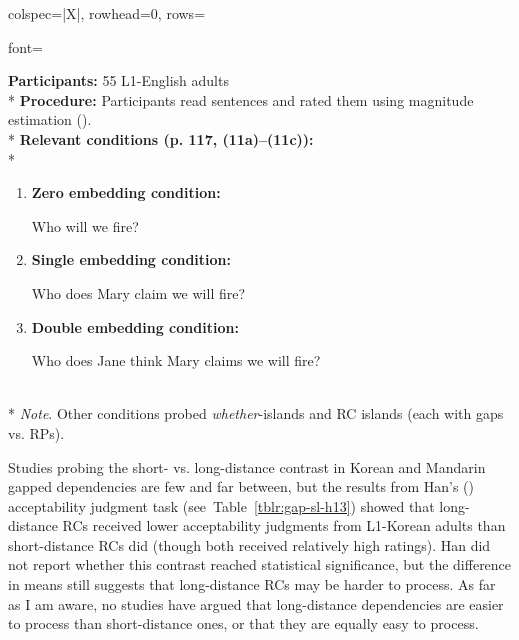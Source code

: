 \begin{longtblr}[caption={\textcite{alexopoulou.keller2007}: Acceptability judgment task (Experiment 1)}, label={tblr:gap-sl-ak07}]{colspec={|X|}, rowhead=0, rows={font=\raggedright{}}}\hline
\textbf{Participants:} 55 L1-English adults \vspace{5pt}\\*
\textbf{Procedure:} Participants read sentences and rated them using magnitude estimation (\cite{bard.etal1996}). \vspace{5pt}\\*
\textbf{Relevant conditions (p. 117, (11a)--(11c)):} \vspace{5pt}\\*
\begin{varwidth}{\linewidth}\begin{enumerate}[\bfseries (a),itemsep=5pt] 
\item \textbf{Zero embedding condition:}\par\nobreak
Who will we fire?
\item \textbf{Single embedding condition:}\par\nobreak
Who does Mary claim we will fire?
\item \textbf{Double embedding condition:}\par\nobreak
Who does Jane think Mary claims we will fire?
\end{enumerate}\end{varwidth}\vspace{5pt}\\*
\textit{Note}. Other conditions probed \textit{whether}-islands and RC islands (each with gaps vs. RPs).\\\hline
\end{longtblr}

Studies probing the short- vs. long-distance contrast in Korean and Mandarin gapped dependencies are few and far between, but the results from Han's (\citeyear{han2013}) acceptability judgment task (see~Table~\ref{tblr:gap-sl-h13}) showed that long-distance RCs received lower acceptability judgments from L1-Korean adults than short-distance RCs did (though both received relatively high ratings). Han did not report whether this contrast reached statistical significance, but the difference in means still suggests that long-distance RCs may be harder to process. As far as I am aware, no studies have argued that long-distance dependencies are easier to process than short-distance ones, or that they are equally easy to process.

